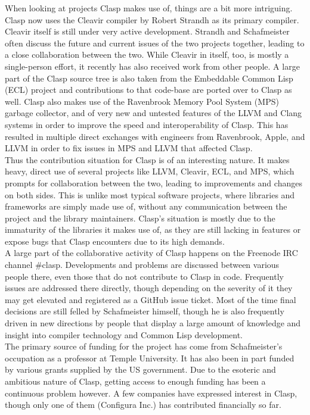 When looking at projects Clasp makes use of, things are a bit more intriguing. Clasp now uses the Cleavir compiler by Robert Strandh\cite{clasp-cleavir} as its primary compiler. Cleavir itself is still under very active development. Strandh and Schafmeister often discuss the future and current issues of the two projects together, leading to a close collaboration between the two. While Cleavir in itself, too, is mostly a single-person effort, it recently has also received work from other people. A large part of the Clasp source tree is also taken from the Embeddable Common Lisp (ECL)\cite{clasp-ecl} project and contributions to that code-base are ported over to Clasp as well. Clasp also makes use of the Ravenbrook Memory Pool System (MPS)\cite{clasp-mps} garbage collector, and of very new and untested features of the LLVM and Clang systems in order to improve the speed and interoperability of Clasp. This has resulted in multiple direct exchanges with engineers from Ravenbrook, Apple, and LLVM in order to fix issues in MPS and LLVM that affected Clasp. \\

Thus the contribution situation for Clasp is of an interesting nature. It makes heavy, direct use of several projects like LLVM, Cleavir, ECL, and MPS, which prompts for collaboration between the two, leading to improvements and changes on both sides. This is unlike most typical software projects, where libraries and frameworks are simply made use of, without any communication between the project and the library maintainers. Clasp's situation is mostly due to the immaturity of the libraries it makes use of, as they are still lacking in features or expose bugs that Clasp encounters due to its high demands. \\

A large part of the collaborative activity of Clasp happens on the Freenode IRC channel \#clasp. Developments and problems are discussed between various people there, even those that do not contribute to Clasp in code. Frequently issues are addressed there directly, though depending on the severity of it they may get elevated and registered as a GitHub issue ticket. Most of the time final decisions are still felled by Schafmeister himself, though he is also frequently driven in new directions by people that display a large amount of knowledge and insight into compiler technology and Common Lisp development. \\

The primary source of funding for the project has come from Schafmeister's occupation as a professor at Temple University. It has also been in part funded by various grants supplied by the US government\cite{clasp-grants}. Due to the esoteric and ambitious nature of Clasp, getting access to enough funding has been a continuous problem however. A few companies have expressed interest in Clasp, though only one of them (Configura Inc.) has contributed financially so far. \\

